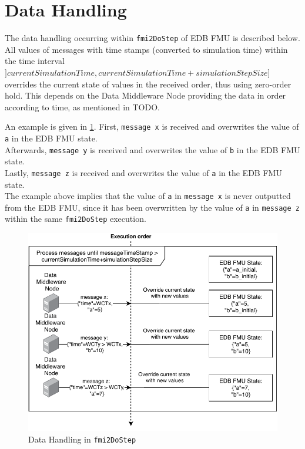 \section{Data Handling}\label{sec:data_handling}
The data handling occurring within \texttt{fmi2DoStep} of EDB FMU is described
below.
All values of messages with time stamps (converted to simulation time) within the
time interval $]currentSimulationTime,currentSimulationTime + simulationStepSize]$
overrides the current state of values in the received order, thus using
zero-order hold. This depends on the Data Middleware Node providing the data in
order according to time, as mentioned in TODO.

An example is given in \cref{fig:data-handling-dostep}.
First, \texttt{message x} is received and overwrites the value of \texttt{a} in the EDB FMU state.\\
Afterwards, \texttt{message y} is received and overwrites the value of \texttt{b} in
the EDB FMU state.\\
Lastly, \texttt{message z} is received and overwrites the value of
\texttt{a} in the EDB FMU state. \\
The example above implies that the value of \texttt{a} in \texttt{message x}  is never
outputted from the EDB FMU, since it has been overwritten by the value of
\texttt{a} in \texttt{message z} within the same \texttt{fmi2DoStep} execution.

\begin{figure}[htb]
  \centering
  \includegraphics[width=\textwidth]{figures/datahandling.pdf}
  \caption{Data Handling in \texttt{fmi2DoStep}}
  \label{fig:data-handling-dostep}
\end{figure}

